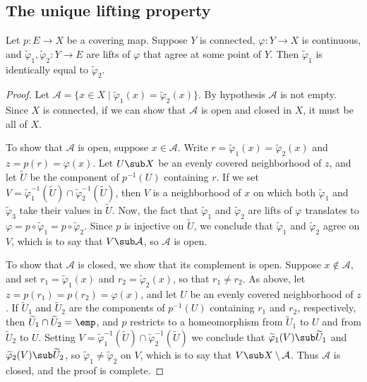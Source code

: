 \subsection{The unique lifting property}
\begin{theorem}\label{lift prop}
Let $p:E\to X$ be a covering map. Suppose $Y$ is connected, $\varphi:Y\to X$ is continuous, and $\widetilde{\varphi}_1,\widetilde{\varphi}_2:Y\to E$ are lifts of
$\varphi$ that agree at some point of $Y$. Then $\widetilde{\varphi}_1$ is identically equal to $\widetilde{\varphi}_2$.
\end{theorem}
\begin{proof}
Let $\mathcal{A}=\{x\in X\mid \widetilde{\varphi}_1(x)=\widetilde{\varphi}_2(x)\}$. By hypothesis $\mathcal{A}$ is not empty. Since $X$ is connected, if we can show that $\mathcal{A}$ is open and closed in $X$, it must be all of $X$.\par
To show that $\mathcal{A}$ is open, suppose $x\in\mathcal{A}$. Write $r=\widetilde{\varphi}_1(x)=\widetilde{\varphi}_2(x)$ and $z=p(r)=\varphi(x)$. Let $U\sub X$ be an evenly covered neighborhood of $z$, and let $\widetilde{U}$ be the
component of $p^{-1}(U)$ containing $r$. If we set $V=\widetilde{\varphi}_1^{-1}(\widetilde{U})\cap\widetilde{\varphi}_2^{-1}(\widetilde{U})$, then $V$ is a neighborhood of $x$ on which both $\widetilde{\varphi}_1$ and $\widetilde{\varphi}_3$ take their values in $\widetilde{U}$. Now, the fact that $\widetilde{\varphi}_1$ and $\widetilde{\varphi}_2$ are lifts of $\varphi$ translates to $\varphi=p\circ\widetilde{\varphi}_1=p\circ\widetilde{\varphi}_2$. Since $p$ is
injective on $\widetilde{U}$, we conclude that $\widetilde{\varphi}_1$ and $\widetilde{\varphi}_2$ agree on $V$, which is to say that $V\sub\mathcal{A}$, so $\mathcal{A}$ is open.\par
To show that $\mathcal{A}$ is closed, we show that its complement is open. Suppose $x\notin\mathcal{A}$, and set $r_1=\widetilde{\varphi}_1(x)$ and $r_2=\widetilde{\varphi}_2(x)$, so that $r_1\neq r_2$. As above, let $z=p(r_1)=p(r_2)=\varphi(x)$, and let $U$ be an evenly covered neighborhood of $z$. If $\widetilde{U}_1$ and $\widetilde{U}_2$ are the components of $p^{-1}(U)$ containing $r_1$ and $r_2$, respectively, then $\widetilde{U}_1\cap\widetilde{U}_2=\emp$, and $p$ restricts to a homeomorphism from $\widetilde{U}_1$ to $U$ and from $\widetilde{U}_2$ to $U$. Setting $V=\widetilde{\varphi}_1^{-1}(\widetilde{U})\cap\widetilde{\varphi}_2^{-1}(\widetilde{U})$ we conclude that $\widetilde{\varphi}_1(V)\sub\widetilde{U}_1$ and $\widetilde{\varphi}_2(V)\sub\widetilde{U}_2$, so $\widetilde{\varphi}_1\neq \widetilde{\varphi}_2$ on $V$, which is to say that $V\sub X\setminus\mathcal{A}$. Thus $\mathcal{A}$ is closed, and the proof is complete.
\end{proof}
